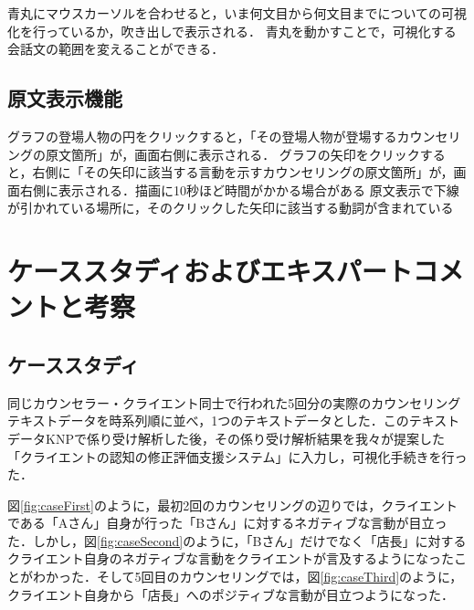 \documentclass[shuuron]{kuee}
\begin{document}
青丸にマウスカーソルを合わせると，いま何文目から何文目までについての可視化を行っているか，吹き出しで表示される．
青丸を動かすことで，可視化する会話文の範囲を変えることができる．


\subsection{原文表示機能}

グラフの登場人物の円をクリックすると，「その登場人物が登場するカウンセリングの原文箇所」が，画面右側に表示される．
グラフの矢印をクリックすると，右側に「その矢印に該当する言動を示すカウンセリングの原文箇所」が，画面右側に表示される．描画に10秒ほど時間がかかる場合がある
原文表示で下線が引かれている場所に，そのクリックした矢印に該当する動詞が含まれている


\section{ケーススタディおよびエキスパートコメントと考察}

\subsection{ケーススタディ}

同じカウンセラー・クライエント同士で行われた5回分の実際のカウンセリングテキストデータを時系列順に並べ，1つのテキストデータとした．このテキストデータKNPで係り受け解析した後，その係り受け解析結果を我々が提案した「クライエントの認知の修正評価支援システム」に入力し，可視化手続きを行った．

図\ref{fig:caseFirst}のように，最初2回のカウンセリングの辺りでは，クライエントである「Aさん」自身が行った「Bさん」に対するネガティブな言動が目立った．しかし，図\ref{fig:caseSecond}のように，「Bさん」だけでなく「店長」に対するクライエント自身のネガティブな言動をクライエントが言及するようになったことがわかった．そして5回目のカウンセリングでは，図\ref{fig:caseThird}のように，クライエント自身から「店長」へのポジティブな言動が目立つようになった．
\end{document}
